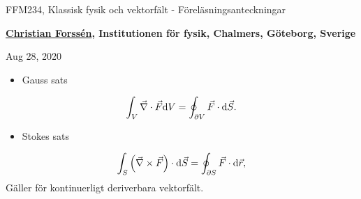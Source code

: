 \documentclass[%
oneside,                 %
final,                   %
10pt]{article}
\newenvironment{summary_mdfboxadmon}[1][]{
\begin{summary_mdfboxmdframed}[frametitle=#1]
}
{
\end{summary_mdfboxmdframed}
}
\begin{document}

\newcommand{\exercisesection}[1]{\subsection*{#1}}







\thispagestyle{empty}

\begin{center}
{\LARGE\bf
\begin{spacing}{1.25}
FFM234, Klassisk fysik och vektorfält - Föreläsningsanteckningar
\end{spacing}
}
\end{center}


\begin{center}
{\bf \href{{http://fy.chalmers.se/subatom/tsp/}}{Christian Forssén}, Institutionen för fysik, Chalmers, Göteborg, Sverige${}^{}$} \\ [0mm]
\end{center}

\begin{center}
\end{center}
    

\begin{center}
Aug 28, 2020
\end{center}

\vspace{1cm}



\begin{summary_mdfboxadmon}
\begin{itemize}
\item Gauss sats
\end{itemize}

\noindent
\begin{equation}
  \int_V \vec{\nabla} \cdot \vec{F} \mbox{d}V = \oint_{\partial V} \vec{F} \cdot \mbox{d} \vec{S}.
\end{equation}
\begin{itemize}
\item Stokes sats
\end{itemize}

\noindent
\begin{equation}
  \int_S \left( \vec{\nabla} \times \vec{F}\right) \cdot \mbox{d}\vec{S} = \oint_{\partial S} \vec{F}\cdot
\mbox{d}\vec{r},
\end{equation}
Gäller för kontinuerligt deriverbara vektorfält.
\end{summary_mdfboxadmon} %
\end{document}
